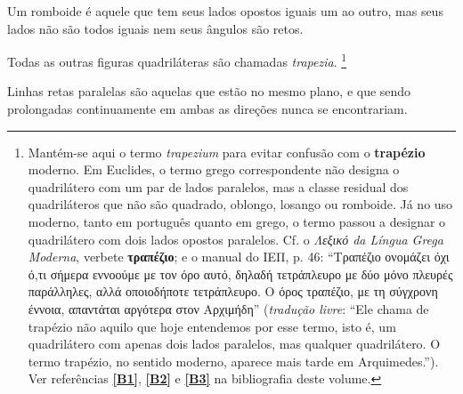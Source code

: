 \documentclass[booklanguage=brazilian]{byrnebook}
\newcommand{\bookbibref}[2]{\hyperref[#1]{\textbf{[#2]}}}
\begin{document}
\startdefinition{}\label{def:I.XXXIII}
\begin{center}
\drawCurrentPictureInMargin[inside] Um romboide é aquele que tem seus lados opostos iguais um ao outro, mas seus lados não são todos iguais nem seus ângulos são retos.
\end{center}

\startdefinition{}\label{def:I.XXXIV}
\begin{center}
Todas as outras figuras quadriláteras são chamadas \emph{trapezia}.
\footnote{Mantém-se aqui o termo \emph{trapezium} para evitar confusão com o \textbf{trapézio} moderno. Em Euclides, o termo grego correspondente não designa o quadrilátero com um par de lados paralelos, mas a classe residual dos quadriláteros que não são quadrado, oblongo, losango ou romboide. Já no uso moderno, tanto em português quanto em grego, o termo passou a designar o quadrilátero com dois lados opostos paralelos. Cf. o \emph{Λεξικό da Língua Grega Moderna}, verbete \textbf{τραπέζιο}; e o manual do ΙΕΠ, p. 46: “Τραπέζιο ονομάζει όχι ό,τι σήμερα εννοούμε με τον όρο αυτό, δηλαδή τετράπλευρο με δύο μόνο πλευρές παράλληλες, αλλά οποιοδήποτε τετράπλευρο. Ο όρος τραπέζιο, με τη σύγχρονη έννοια, απαντάται αργότερα στον Αρχιμήδη” (\emph{tradução livre}: “Ele chama de trapézio não aquilo que hoje entendemos por esse termo, isto é, um quadrilátero com apenas dois lados paralelos, mas qualquer quadrilátero. O termo trapézio, no sentido moderno, aparece mais tarde em Arquimedes.”). Ver referências \bookbibref{bib:greek-dictionary}{B1}, \bookbibref{bib:iep}{B2} e \bookbibref{bib:mathworld}{B3} na bibliografia deste volume.}
\end{center}

\startdefinition{}\label{def:I.XXXV}
\begin{center}
\drawCurrentPictureInMargin[inside] Linhas retas paralelas são aquelas que estão no mesmo plano, e que sendo prolongadas continuamente em ambas as direções nunca se encontrariam.
\end{center}
\end{document}
